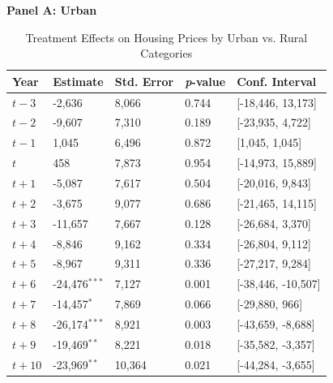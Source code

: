 \begin{table}[htbp]
\begin{threeparttable}
\begin{minipage}{\linewidth}
\begin{tablenotes}[flushleft]
    \end{tablenotes}
    \end{minipage}
    \end{threeparttable}
\end{table}


\begin{table}[htbp]
    \centering
    \caption{Treatment Effects on Housing Prices by Urban vs. Rural Categories}
    \label{tab:urban_rural_results}
    \begin{threeparttable}
    \small
    \textbf{Panel A: Urban} \\[4pt]
    \begin{tabularx}{\textwidth}{l*{4}{X}}
    \hline
    \textbf{Year} & \textbf{Estimate} & \textbf{Std. Error} & \textbf{\textit{p}-value} & \textbf{Conf. Interval} \\
    \hline
    $t - 3$  & -2,636  & 8,066  & 0.744 & [-18,446, 13,173] \\
    $t - 2$  & -9,607  & 7,310  & 0.189 & [-23,935, 4,722] \\
    $t - 1$  & 1,045   & 6,496  & 0.872 & [1,045, 1,045] \\
    $t$  & 458     & 7,873  & 0.954 & [-14,973, 15,889] \\
    $t + 1$  & -5,087  & 7,617  & 0.504 & [-20,016, 9,843] \\
    $t + 2$  & -3,675  & 9,077  & 0.686 & [-21,465, 14,115] \\
    $t + 3$  & -11,657 & 7,667  & 0.128 & [-26,684, 3,370] \\
    $t + 4$  & -8,846  & 9,162  & 0.334 & [-26,804, 9,112] \\
    $t + 5$  & -8,967  & 9,311  & 0.336 & [-27,217, 9,284] \\
    $t + 6$  & -24,476$^{***}$ & 7,127  & 0.001 & [-38,446, -10,507] \\
    $t + 7$  & -14,457$^{*}$ & 7,869  & 0.066 & [-29,880, 966] \\
    $t + 8$  & -26,174$^{***}$ & 8,921  & 0.003 & [-43,659, -8,688] \\
    $t + 9$  & -19,469$^{**}$ & 8,221  & 0.018 & [-35,582, -3,357] \\
    $t + 10$ & -23,969$^{**}$ & 10,364 & 0.021 & [-44,284, -3,655] \\
    \hline
    \end{tabularx}
    
    \vspace{8pt}
    

\end{threeparttable}
\end{table}
